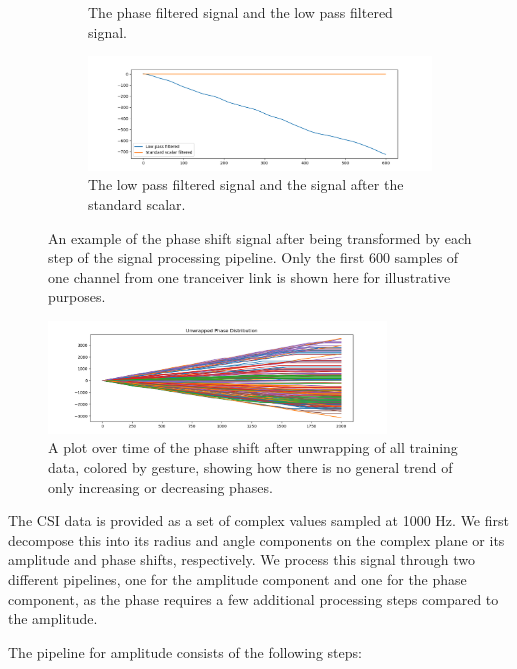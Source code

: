 \begin{figure}
\begin{subfigure}{0.49\textwidth}
		\caption{The phase filtered signal and the low pass filtered signal.}
	\end{subfigure}
	\hfill
	\begin{subfigure}{0.49\textwidth}
		\centering
		\includegraphics[width=\textwidth]{figures/phase_step_4}
		\caption{The low pass filtered signal and the signal after the standard scalar.}
	\end{subfigure}
	\hfill
	\caption{An example of the phase shift signal after being transformed by each step of the signal processing pipeline. Only the first 600 samples of one channel from one tranceiver link is shown here for illustrative purposes.} \label{fig:phase-pipeline}
\end{figure}

\begin{figure}
	\centering
	\includegraphics[width=0.8\textwidth]{figures/phase_unwrap}
	\caption{A plot over time of the phase shift after unwrapping of all training data, colored by gesture, showing how there is no general trend of only increasing or decreasing phases.}\label{fig:phase-unwrap}
\end{figure}

The CSI data is provided as a set of complex values sampled at 1000 Hz.
We first decompose this into its radius and angle components on the complex plane or its amplitude and phase shifts, respectively.
We process this signal through two different pipelines, one for the amplitude component and one for the phase component, as the phase requires a few additional processing steps compared to the amplitude.

The pipeline for amplitude consists of the following steps:

